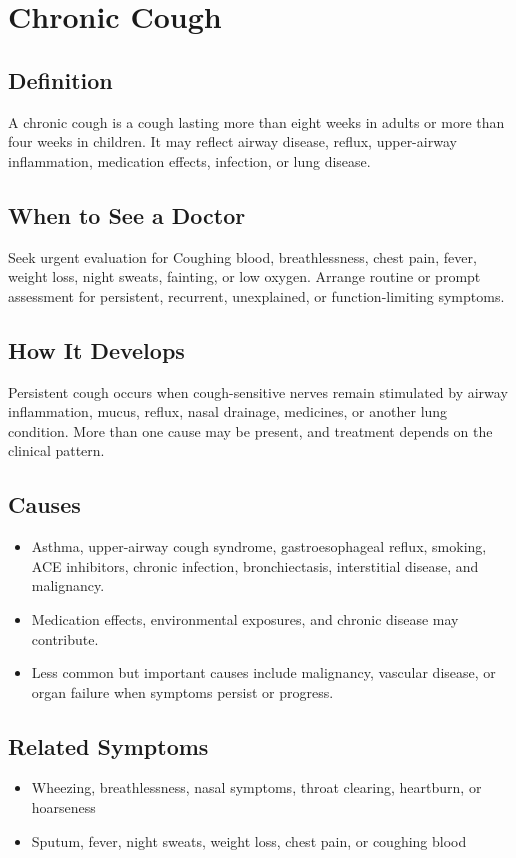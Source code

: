 \chapter{Chronic Cough}

\section*{Definition}
A chronic cough is a cough lasting more than eight weeks in adults or more than four weeks in children. It may reflect airway disease, reflux, upper-airway inflammation, medication effects, infection, or lung disease.

\section*{When to See a Doctor}
Seek urgent evaluation for Coughing blood, breathlessness, chest pain, fever, weight loss, night sweats, fainting, or low oxygen. Arrange routine or prompt assessment for persistent, recurrent, unexplained, or function-limiting symptoms.

\section*{How It Develops}
Persistent cough occurs when cough-sensitive nerves remain stimulated by airway inflammation, mucus, reflux, nasal drainage, medicines, or another lung condition. More than one cause may be present, and treatment depends on the clinical pattern.

\section*{Causes}
\begin{itemize}
  \item Asthma, upper-airway cough syndrome, gastroesophageal reflux, smoking, ACE inhibitors, chronic infection, bronchiectasis, interstitial disease, and malignancy.
  \item Medication effects, environmental exposures, and chronic disease may contribute.
  \item Less common but important causes include malignancy, vascular disease, or organ failure when symptoms persist or progress.
\end{itemize}

\section*{Related Symptoms}
\begin{itemize}
  \item Wheezing, breathlessness, nasal symptoms, throat clearing, heartburn, or hoarseness
  \item Sputum, fever, night sweats, weight loss, chest pain, or coughing blood
\end{itemize}

